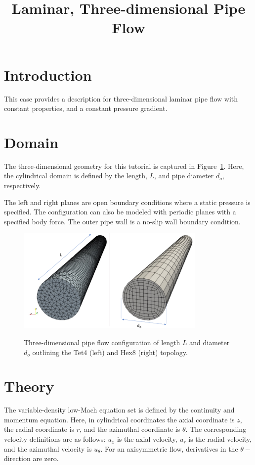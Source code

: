 \documentclass{article}
\title{Laminar, Three-dimensional Pipe Flow}
\date{}
\begin{document}
\maketitle

\section{Introduction}
This case provides a description for three-dimensional laminar
pipe flow with constant properties, and a constant pressure gradient.

\section{Domain}
The three-dimensional geometry for this tutorial is captured in 
Figure~\ref{fig:geom}. Here, the cylindrical domain is defined by the 
length, $L$, and pipe diameter $d_o$, respectively. 

The left and right planes are open boundary conditions where a static pressure is specified. The configuration
can also be modeled with periodic planes with a specified body force. The outer pipe wall is a 
no-slip wall boundary condition.

\begin{figure}[!htbp]
  \centering
  {
   \includegraphics[height=2.0in]{images/3d_tet4_hex8_pipe_geom.pdf}
  }
  \caption{Three-dimensional pipe flow configuration of length $L$ and 
    diameter $d_o$ outlining the Tet4 (left) and Hex8 (right) topology.}
  \label{fig:geom}
\end{figure}

\section{Theory}
The variable-density low-Mach equation set is defined by the continuity and momentum equation.
Here, in cylindrical coordinates the axial coordinate
is $z$, the radial coordinate is $r$, and the azimuthal
coordinate is $\theta$.  The corresponding velocity definitions are as follows:
 $u_x$ is the axial velocity, $u_r$ is the radial velocity, and the azimuthal velocity is $u_\theta$. 
For an axisymmetric flow, derivatives in the $\theta-$direction are zero.
\end{document}
